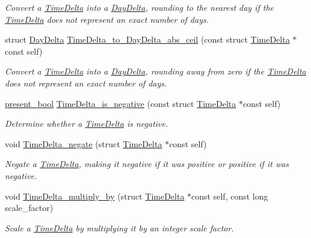 \begin{DoxyCompactItemize}
\begin{DoxyCompactList}\small\item\em Convert a \hyperlink{structTimeDelta}{Time\-Delta} into a \hyperlink{structDayDelta}{Day\-Delta}, rounding to the nearest day if the \hyperlink{structTimeDelta}{Time\-Delta} does not represent an exact number of days. \end{DoxyCompactList}\item 
struct \hyperlink{structDayDelta}{Day\-Delta} \hyperlink{time-delta_8h_ae1a3f58fc84a366415dc6cde308b27ee}{Time\-Delta\-\_\-to\-\_\-\-Day\-Delta\-\_\-abs\-\_\-ceil} (const struct \hyperlink{structTimeDelta}{Time\-Delta} $\ast$const self)
\begin{DoxyCompactList}\small\item\em Convert a \hyperlink{structTimeDelta}{Time\-Delta} into a \hyperlink{structDayDelta}{Day\-Delta}, rounding away from zero if the \hyperlink{structTimeDelta}{Time\-Delta} does not represent an exact number of days. \end{DoxyCompactList}\item 
\hyperlink{types_8h_a1c24e2cdd988b886e889080ded176ae0}{present\-\_\-bool} \hyperlink{time-delta_8h_a4fc42a10abf8771117d2f9ced4f11bf2}{Time\-Delta\-\_\-is\-\_\-negative} (const struct \hyperlink{structTimeDelta}{Time\-Delta} $\ast$const self)
\begin{DoxyCompactList}\small\item\em Determine whether a \hyperlink{structTimeDelta}{Time\-Delta} is negative. \end{DoxyCompactList}\item 
void \hyperlink{time-delta_8h_a906aa66074e2d9ef675ea2d2a1d25084}{Time\-Delta\-\_\-negate} (struct \hyperlink{structTimeDelta}{Time\-Delta} $\ast$const self)
\begin{DoxyCompactList}\small\item\em Negate a \hyperlink{structTimeDelta}{Time\-Delta}, making it negative if it was positive or positive if it was negative. \end{DoxyCompactList}\item 
void \hyperlink{time-delta_8h_a7d8b289bc541b4e9037d1297c2e24f6e}{Time\-Delta\-\_\-multiply\-\_\-by} (struct \hyperlink{structTimeDelta}{Time\-Delta} $\ast$const self, const long scale\-\_\-factor)
\begin{DoxyCompactList}\small\item\em Scale a \hyperlink{structTimeDelta}{Time\-Delta} by multiplying it by an integer scale factor. \end{DoxyCompactList}\item 

\end{DoxyCompactItemize}

